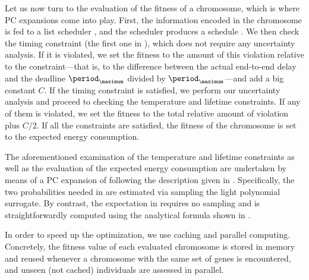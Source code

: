 Let us now turn to the evaluation of the fitness of a chromosome, which is where
\ac{PC} expansions come into play. First, the information encoded in the
chromosome is fed to a list scheduler \cite{adam1974}, and the scheduler
produces a schedule \schedule. We then check the timing constraint (the first
one in ), which does not require any
uncertainty analysis. If it is violated, we set the fitness to the amount of
this violation relative to the constraint---that is, to the difference between
the actual end-to-end delay and the deadline $\period_\maximum$ divided by
$\period_\maximum$---and add a big constant $C$. If the timing constraint is
satisfied, we perform our uncertainty analysis and proceed to checking the
temperature and lifetime constraints. If any of them is violated, we set the
fitness to the total relative amount of violation plus $C / 2$. If all the
constraints are satisfied, the fitness of the chromosome is set to the expected
energy consumption.

The aforementioned examination of the temperature and lifetime constraints as
well as the evaluation of the expected energy consumption are undertaken by
means of a \ac{PC} expansion of  following the
description given in . Specifically, the two
probabilities needed in  are estimated via
sampling the light polynomial surrogate. By contrast, the expectation in
 requires no sampling and is
straightforwardly computed using the analytical formula shown in
.

\begin{remark}
In order to speed up the optimization, we use caching and parallel computing.
Concretely, the fitness value of each evaluated chromosome is stored in memory
and reused whenever a chromosome with the same set of genes is encountered, and
unseen (not cached) individuals are assessed in parallel.
\end{remark}
